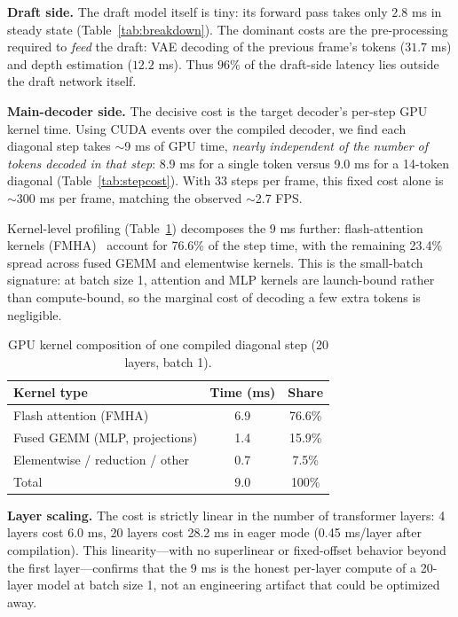 \documentclass[10pt, twocolumn]{article}
\begin{document}
\textbf{Draft side.} The draft model itself is tiny: its forward pass takes only $2.8$ ms in steady state (Table~\ref{tab:breakdown}). The dominant costs are the pre-processing required to \emph{feed} the draft: VAE decoding of the previous frame's tokens ($31.7$ ms) and depth estimation ($12.2$ ms). Thus $96\%$ of the draft-side latency lies outside the draft network itself.

\textbf{Main-decoder side.} The decisive cost is the target decoder's per-step GPU kernel time. Using CUDA events over the compiled decoder, we find each diagonal step takes $\sim$9 ms of GPU time, \emph{nearly independent of the number of tokens decoded in that step}: 8.9 ms for a single token versus 9.0 ms for a 14-token diagonal (Table~\ref{tab:stepcost}). With 33 steps per frame, this fixed cost alone is $\sim$300 ms per frame, matching the observed $\sim$2.7 FPS.

Kernel-level profiling (Table~\ref{tab:kernels}) decomposes the 9 ms further: flash-attention kernels (FMHA)~\cite{flashattention,flashattention2} account for 76.6\% of the step time, with the remaining 23.4\% spread across fused GEMM and elementwise kernels. This is the small-batch signature: at batch size 1, attention and MLP kernels are launch-bound rather than compute-bound, so the marginal cost of decoding a few extra tokens is negligible.

\begin{table}[!ht]
  \centering
  \small
  \caption{GPU kernel composition of one compiled diagonal step (20 layers, batch 1).}
  \label{tab:kernels}
  \begin{tabular}{lcc}
    \toprule
    Kernel type & Time (ms) & Share \\
    \midrule
    Flash attention (FMHA) & 6.9 & 76.6\% \\
    Fused GEMM (MLP, projections) & 1.4 & 15.9\% \\
    Elementwise / reduction / other & 0.7 & 7.5\% \\
    \midrule
    Total & 9.0 & 100\% \\
    \bottomrule
  \end{tabular}
\end{table}

\textbf{Layer scaling.} The cost is strictly linear in the number of transformer layers: 4 layers cost 6.0 ms, 20 layers cost 28.2 ms in eager mode (0.45 ms/layer after compilation). This linearity---with no superlinear or fixed-offset behavior beyond the first layer---confirms that the 9 ms is the honest per-layer compute of a 20-layer model at batch size 1, not an engineering artifact that could be optimized away.
\end{document}

